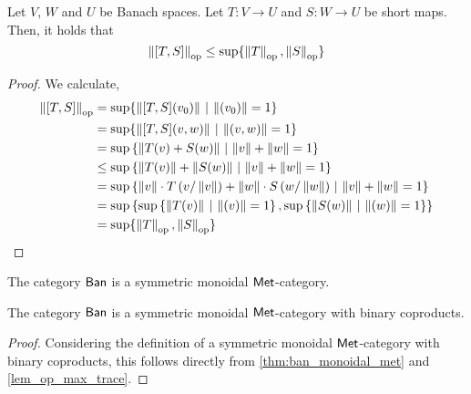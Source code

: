 \begin{lemma} \label{lem_op_max_trace}
  Let $V$, $W$ and $U$ be Banach spaces. Let $ T: V \to U$ and $ S: W \to U$ be short maps. Then, it holds that 
  $$ \left\lVert [T, S] \right\rVert_{\text{op}} \leq \sup \{\left\lVert T \right\rVert_{\text{op}},\left\lVert S \right\rVert_{\text{op}}\}$$
\end{lemma}

\begin{proof}
We calculate,
\begin{align*} 
   \left\lVert [T, S] \right\rVert_{\text{op}} &  = \text{sup}{\{ \left\lVert [T, S] (v_0) \right\rVert   \hspace{2pt} |  \hspace{2pt}  \left\lVert (v_0) \right\rVert = 1  \}}\\
   & = \text{sup}{\{ \left\lVert [T, S] (v, w) \right\rVert   \hspace{2pt} |  \hspace{2pt}  \left\lVert (v, w ) \right\rVert = 1  \}}  \\
   & = \sup \left\{  \left\lVert T (v) + S (w) \right\rVert  \, \vert \, \left\lVert v \right\rVert + \left\lVert w \right\rVert= 1 \right\} \\
   & \leq \sup \left\{  \left\lVert T (v) \right\rVert + \left\lVert S (w) \right\rVert  \, \vert \, \left\lVert v \right\rVert + \left\lVert w \right\rVert= 1 \right\} \\
   & = \sup \left\{ \left\lVert v \right\rVert \cdot   T \left( v / \left\lVert v  \right\rVert\right) + \left\lVert w \right\rVert \cdot S \left( w / \left\lVert w \right\rVert\right)  \, \vert \, \left\lVert v \right\rVert + \left\lVert w \right\rVert= 1  \right\}  \\
   & = \sup  \left\{ \sup \left\{\left\lVert T(v) \right\rVert   \hspace{2pt} |  \hspace{2pt}  \left\lVert (v) \right\rVert = 1  \right\},\sup \left\{\left\lVert S(w) \right\rVert   \hspace{2pt} |  \hspace{2pt}  \left\lVert (w) \right\rVert = 1   \right\}  \right\} \\
   & = \sup \{\left\lVert T \right\rVert_{\text{op}},\left\lVert S \right\rVert_{\text{op}}\}
\end{align*}
 
\end{proof}


\begin{theorem} \cite[Theorem 4.3]{dahlqvist2023syntactic} \label{thm:ban_monoidal_met}
      The category $\mathsf{Ban}$ is a  symmetric monoidal $\mathsf{Met}$-category.
  \end{theorem}

  \begin{theorem}
      The category $\mathsf{Ban}$ is a  symmetric monoidal $\mathsf{Met}$-category with binary coproducts.
  \end{theorem}

\begin{proof}
  Considering the definition of a symmetric monoidal $\mathsf{Met}$-category with binary coproducts, this follows directly from \autoref{thm:ban_monoidal_met} and \autoref{lem_op_max_trace}.    
\end{proof}



